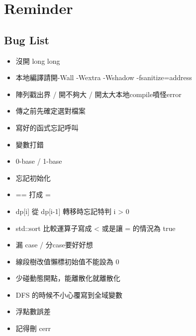 \documentclass[a4paper,10pt,twocolumn,oneside,x11names]{article}
\begin{document}
\renewcommand{\headrulewidth}{0.4pt}
\renewcommand{\contentsname}{Contents} 

\pagestyle{fancy}
\fancyfoot{}
\fancyhead[R]{\thepage}


{\scriptsize
\begin{multicols}{2}
\tableofcontents
\end{multicols}}

\section{Reminder}
\subsection{Bug List}
\begin{itemize}[nolistsep]
\item 沒開 long long
\item 本地編譯請開-Wall -Wextra -Wshadow -fsanitize=address
\item 陣列戳出界 / 開不夠大 / 開太大本地compile噴怪error
\item 傳之前先確定選對檔案
\item 寫好的函式忘記呼叫
\item 變數打錯
\item 0-base / 1-base
\item 忘記初始化
\item == 打成 =
\item dp[i] 從 dp[i-1] 轉移時忘記特判 i > 0
\item std::sort 比較運算子寫成 < 或是讓 = 的情況為 true
\item 漏 case / 分case要好好想
\item 線段樹改值懶標初始值不能設為 0
\item 少碰動態開點，能離散化就離散化
\item DFS 的時候不小心覆寫到全域變數
\item 浮點數誤差
\item 記得刪 cerr
\end{itemize}

\end{document}
